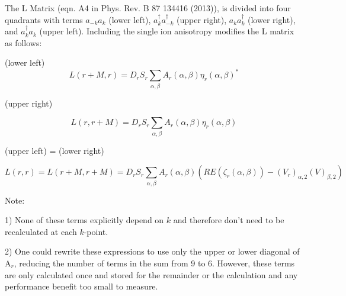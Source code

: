\documentclass[12pt]{report}
\begin{document}
The L Matrix (eqn. A4 in Phys. Rev. B  87 134416 (2013)), is divided into four quadrants with 
terms $a_{-k} a_k $ (lower left), $a_k^{\dagger} a_{-k}^{\dagger}$ (upper right), $a_k a_k^{\dagger}$ (lower right), and $a_k^{\dagger} a_k$ (upper left).
Including the single ion anisotropy modifies the L matrix as follows:

(lower left)
\begin{equation}
L(r+M,r) = D_r S_r  \sum_{\alpha,\beta} A_r(\alpha,\beta) \eta_r(\alpha,\beta)^* 
\end{equation}

(upper right)

\begin{equation}
L(r,r+M) = D_r S_r  \sum_{\alpha,\beta} A_r(\alpha,\beta) \eta_r(\alpha,\beta) 
\end{equation}
 
 (upper left) = (lower right)
 
 \begin{equation}
L(r,r)  = L(r+M,r+M) =  D_r S_r  \sum_{\alpha,\beta} A_r(\alpha,\beta)\left( RE(\zeta_r(\alpha,\beta)) - \left(V_r\right)_{\alpha,2} \left(V\right)_{\beta,2} \right)
 \end{equation}
 
 Note:
 
 1) None of these terms explicitly depend on $k$ and therefore don't need to be recalculated at each $k$-point.
 
 2) One could rewrite these expressions to use only the upper or lower diagonal of A$_r$, reducing the number of terms in the sum from 9 to 6. However, these 
 terms are only calculated once and stored for the remainder or the calculation and any performance benefit too small to measure.
 
\end{document}
